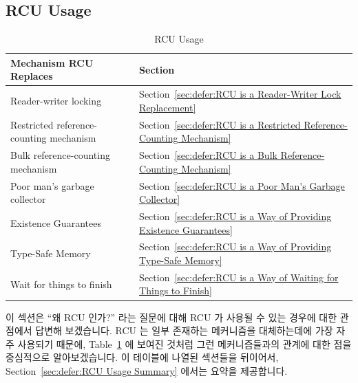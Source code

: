 
\subsection{RCU Usage}
\label{sec:defer:RCU Usage}

\begin{table}[tb]
\begin{center}
\scriptsize
\begin{tabular}{l|l}
Mechanism RCU Replaces & Section \\
\hline
\hline
Reader-writer locking &
	Section~\ref{sec:defer:RCU is a Reader-Writer Lock Replacement} \\
Restricted reference-counting mechanism &
	Section~\ref{sec:defer:RCU is a Restricted Reference-Counting Mechanism} \\
Bulk reference-counting mechanism &
	Section~\ref{sec:defer:RCU is a Bulk Reference-Counting Mechanism} \\
Poor man's garbage collector &
	Section~\ref{sec:defer:RCU is a Poor Man's Garbage Collector} \\
Existence Guarantees &
	Section~\ref{sec:defer:RCU is a Way of Providing Existence Guarantees} \\
Type-Safe Memory &
	Section~\ref{sec:defer:RCU is a Way of Providing Type-Safe Memory} \\
Wait for things to finish &
	Section~\ref{sec:defer:RCU is a Way of Waiting for Things to Finish} \\
\end{tabular}
\end{center}
\caption{RCU Usage}
\label{tab:defer:RCU Usage}
\end{table}

이 섹션은 ``왜 RCU 인가?'' 라는 질문에 대해 RCU 가 사용될 수 있는 경우에 대한
관점에서 답변해 보겠습니다.
RCU 는 일부 존재하는 메커니즘을 대체하는데에 가장 자주 사용되기 때문에,
Table~\ref{tab:defer:RCU Usage} 에 보여진 것처럼 그런 메커니즘들과의 관계에
대한 점을 중심적으로 알아보겠습니다.
이 테이블에 나열된 섹션들을 뒤이어서, Section~\ref{sec:defer:RCU Usage Summary}
에서는 요약을 제공합니다.

